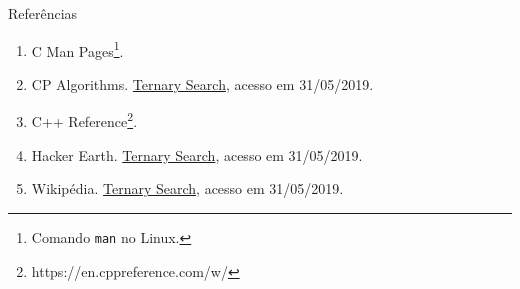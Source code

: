 \begin{frame}[fragile]{Referências}

    \begin{enumerate}
        \item C Man Pages\footnote{Comando \texttt{man} no Linux.}.

        \item CP Algorithms. \href{https://cp-algorithms.com/num_methods/ternary_search.html}{Ternary Search}, acesso em 31/05/2019.

		\item C++ Reference\footnote{https://en.cppreference.com/w/}.

        \item Hacker Earth. \href{https://www.hackerearth.com/pt-br/practice/algorithms/searching/ternary-search/tutorial/}{Ternary Search}, acesso em 31/05/2019.

        \item Wikipédia. \href{https://en.wikipedia.org/wiki/Ternary_search}{Ternary Search}, acesso em 31/05/2019.
    \end{enumerate}

\end{frame}
